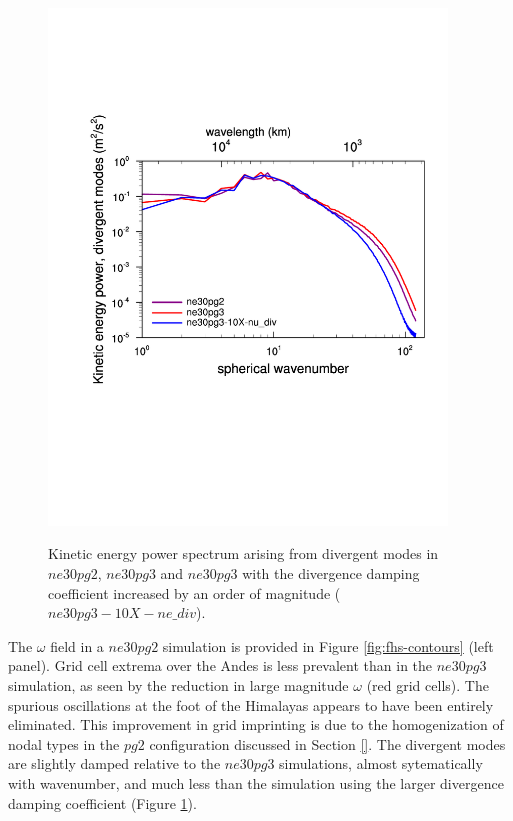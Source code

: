 \documentclass{agujournal}
\begin{document}
\begin{figure}[t]
\begin{center}
\noindent\includegraphics[width=25pc,angle=0]{figs/fhstopo_Divergence_ne30pg2-v-ne30pg3-v-10Xnudiv.pdf}\\
\end{center}
\caption{Kinetic energy power spectrum arising from divergent modes in $ne30pg2$, $ne30pg3$ and $ne30pg3$ with the divergence damping coefficient increased by an order of magnitude ($ne30pg3-10X-ne\_div$).}
\label{fig:fhs-div}
\end{figure}

The $\omega$ field in a $ne30pg2$ simulation is provided in Figure \ref{fig:fhs-contours} (left panel). Grid cell extrema over the Andes is less prevalent than in the $ne30pg3$ simulation, as seen by the reduction in large magnitude $\omega$ (red grid cells). The spurious oscillations at the foot of the Himalayas appears to have been entirely eliminated. This improvement in grid imprinting is due to the homogenization of nodal types in the $pg2$ configuration discussed in Section \ref{}. The divergent modes are slightly damped relative to the $ne30pg3$ simulations, almost sytematically with wavenumber, and much less than the simulation using the larger divergence damping coefficient (Figure \ref{fig:fhs-div}).  
\end{document}
